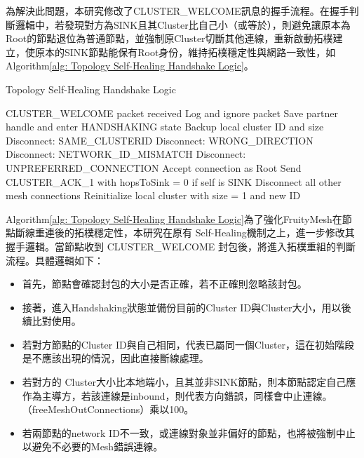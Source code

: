 \begin{ZhChapter}
為解決此問題，本研究修改了CLUSTER\_WELCOME訊息的握手流程。在握手判斷邏輯中，若發現對方為SINK且其Cluster比自己小（或等於），則避免讓原本為Root的節點退位為普通節點，並強制原Cluster切斷其他連線，重新啟動拓樸建立，使原本的SINK節點能保有Root身份，維持拓樸穩定性與網路一致性，如Algorithm\ref{alg: Topology Self-Healing Handshake Logic}。

\begin{algorithm}[H]
\caption{Topology Self-Healing Handshake Logic}
\label{alg: Topology Self-Healing Handshake Logic}
\begin{algorithmic}[1]
\Require CLUSTER\_WELCOME packet received
    \State Log and ignore packet
\Else
    \State Save partner handle and enter HANDSHAKING state
    \State Backup local cluster ID and size
        \State Disconnect: SAME\_CLUSTERID
            \State Disconnect: WRONG\_DIRECTION
        \EndIf
        \State Disconnect: NETWORK\_ID\_MISMATCH
        \State Disconnect: UNPREFERRED\_CONNECTION
    \Else
        \State Accept connection as Root
        \State Send CLUSTER\_ACK\_1 with hopsToSink = 0 if self is SINK
        \State Disconnect all other mesh connections
        \State Reinitialize local cluster with size = 1 and new ID
    \EndIf
\EndIf
\end{algorithmic}
\end{algorithm}

Algorithm\ref{alg: Topology Self-Healing Handshake Logic}為了強化FruityMesh在節點斷線重連後的拓樸穩定性，本研究在原有 Self-Healing機制之上，進一步修改其握手邏輯。當節點收到 CLUSTER\_WELCOME 封包後，將進入拓樸重組的判斷流程。具體邏輯如下：

\begin{itemize}
    \item 首先，節點會確認封包的大小是否正確，若不正確則忽略該封包。
    \item 接著，進入Handshaking狀態並備份目前的Cluster ID與Cluster大小，用以後續比對使用。
    \item 若對方節點的Cluster ID與自己相同，代表已屬同一個Cluster，這在初始階段是不應該出現的情況，因此直接斷線處理。
    \item 若對方的 Cluster大小比本地端小，且其並非SINK節點，則本節點認定自己應作為主導方，若該連線是inbound，則代表方向錯誤，同樣會中止連線。（freeMeshOutConnections）乘以100。
    \item 若兩節點的network ID不一致，或連線對象並非偏好的節點，也將被強制中止以避免不必要的Mesh錯誤連線。
\end{itemize}


\end{ZhChapter}
